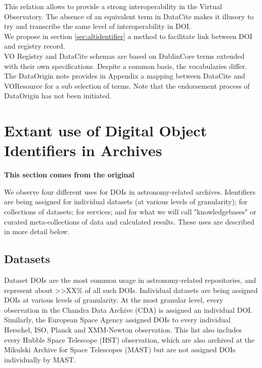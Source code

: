 \documentclass[11pt,a4paper]{ivoa}
\newcommand{\dataciteterm}[1]{\colorbox{lightgray}{DataCite:\textbf{#1}}}
\begin{document}
 This relation allows to provide a strong interoperability in the Virtual Observatory. The absence of an equivalent term in DataCite makes it illusory to try and transcribe the same level of interoperability in DOI.\\
 
 
 
 We propose in section \ref{sec:altidentifier} a method to facilitate link between DOI and registry record.\\
 
VO Registry and DataCite schemas are based on DublinCore terms extended with their own specifications. Despite a common basis, the vocabularies differ. 
The DataOrigin note provides in Appendix a mapping between DataCite and VOResource for a sub selection of terms. Note that the endorsement process of DataOrigin has not been initiated.
 
 
\section{Extant use of Digital Object Identiﬁers in Archives}
\textbf{\color{red} This section comes from the original}

\label{sec:usage}
We observe four different uses for DOIs in astronomy-related archives.
Identifiers are being assigned for individual datasets (at various levels of granularity); for collections of datasets; for services; and for what we will call "knowledgebases" or curated meta-collections of data and calculated results. 
These uses are described in more detail below.

\subsection{Datasets}
\label{sec:intro:datasets}

Dataset DOIs are the most common usage in astronomy-related repositories, and represent about >>XX\% of all such DOIs.
Individual datasets are being assigned DOIs at various levels of granularity. 
At the most granular level, every observation in the Chandra Data Archive (CDA) is assigned an individual DOI.
Similarly, the European Space Agency assigned DOIs to every individual Herschel, ISO, Planck and XMM-Newton observation. 
This list also includes every Hubble Space Telescope (HST) observation, which are also archived at the Mikulski Archive for Space Telescopes (MAST) but are not assigned DOIs individually by MAST.
\end{document}
